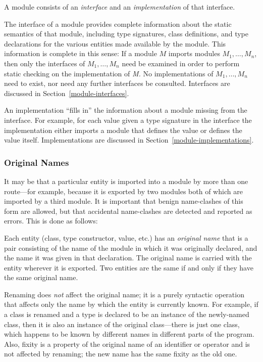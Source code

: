 A module consists of an {\em interface} and an
{\em implementation} of that interface.

The interface of a module provides complete information about the
static semantics of that module, including type signatures, class
definitions, and type declarations for the various entities made
available by the module.  This information is complete in this
sense:  If a module $M$ imports modules $M_1, \ldots, M_n$,
then only the interfaces of $M_1, \ldots, M_n$ need be examined in
order to perform static checking on the implementation of {\it M.}  No
implementations of $M_1, \ldots, M_n$ need to exist, nor need any
further interfaces be consulted.  Interfaces are discussed
in Section~\ref{module-interfaces}.

An implementation ``fills in'' the information about a module missing
from the interface.  For example, for each value given a type
signature in the interface the implementation either imports a module
that defines the value or defines the value itself.  Implementations
are discussed in Section~\ref{module-implementations}.

\subsubsection{Original Names}
\label{original-names}

It may be that a particular entity is imported into a module by more
than one route---for example, because it is exported by two modules
both of which are imported by a third module.  It is important that
benign name-clashes of this form are allowed, but that accidental
name-clashes are detected and reported as errors.  This is done as
follows:

Each entity (class, type constructor, value, etc.) has an {\em
original name} that is a pair consisting of the name of the module in
which it was originally declared, and the name it was given in that
declaration.  The original name is carried with the entity wherever it
is exported.  Two entities are the same if and only if they have the
same original name.

Renaming does {\em not} affect the original name; it is a purely
syntactic operation that affects only the name by which the entity is
currently known.  For example, if a class is renamed and a type is
declared to be an instance of the newly-named class, then it is also
an instance of the original class---there is just one class, which
happens to be known by different names in different parts of the
program.  Also, fixity is a property of the original name of an
identifier or operator and is not affected by renaming; the new
name has the same fixity as the old one.

